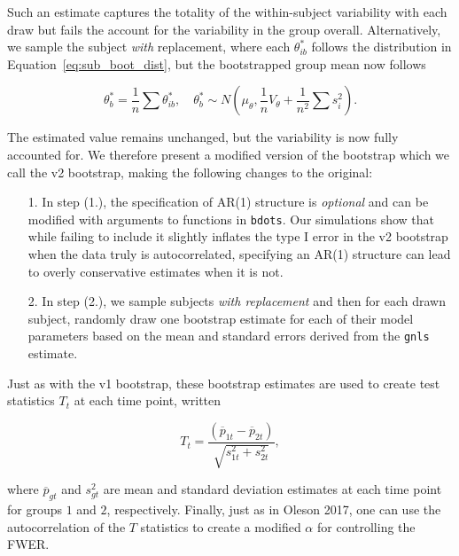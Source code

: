 \documentclass{article}
\newcommand{\xt}{\texttt}
\begin{document}
Such an estimate captures the totality of the within-subject variability with each draw but fails the account for the variability in the group overall. Alternatively, we sample the subject \textit{with} replacement, where each $\theta_{ib}^*$ follows the distribution in Equation~\ref{eq:sub_boot_dist}, but the bootstrapped group mean now follows

\begin{equation}\label{eq:w_rep_boot}
\theta^{*}_b = \frac1n \sum \theta^{*}_{ib}, \quad \theta^{*}_b  \sim N \left( \mu_{\theta}, \frac1n V_{\theta} + \frac{1}{n^2} \sum s_i^2 \right).
\end{equation}

The estimated value remains unchanged, but the variability is now fully accounted for. We therefore present a modified version of the bootstrap which we call the v2 bootstrap, making the following changes to the original:

\begin{singlespace}
\begin{enumerate}
\vspace{-2mm}
\item[1.] In step (1.), the specification of AR(1) structure is \textit{optional} and can be modified with arguments to functions in \xt{bdots}. Our simulations show that while failing to include it slightly inflates the type I error in the v2 bootstrap when the data truly is autocorrelated, specifying an AR(1) structure can lead to overly conservative estimates when it is not.
\item[2.] In step (2.), we sample subjects \textit{with replacement} and then for each drawn subject, randomly draw one bootstrap estimate for each of their model parameters based on the mean and standard errors derived from the \xt{gnls} estimate.
\end{enumerate}
\end{singlespace}

Just as with the v1 bootstrap, these bootstrap estimates are used to create test statistics $T_t$ at each time point, written

\begin{equation}
T_t = \frac{(\overline{p}_{1t} - \overline{p}_{2t})}{\sqrt{s_{1t}^2 + s_{2t}^2}},
\end{equation}

where $\overline{p}_{gt}$ and $s_{gt}^2$ are mean and standard deviation estimates at each time point for groups $1$ and $2$, respectively. Finally, just as in Oleson 2017, one can use the autocorrelation of the $T$ statistics to create a modified $\alpha$ for controlling the FWER.
\end{document}
